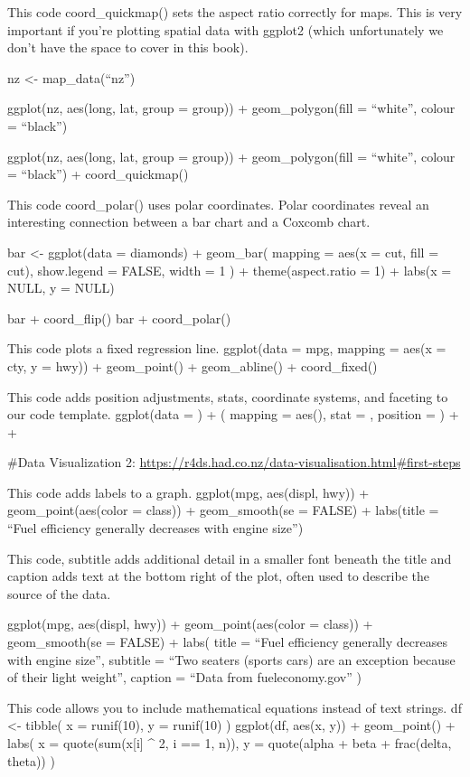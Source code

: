 \documentclass[
]{article}
\begin{document}
This code coord\_quickmap() sets the aspect ratio correctly for maps.
This is very important if you're plotting spatial data with ggplot2
(which unfortunately we don't have the space to cover in this book).

nz \textless- map\_data(``nz'')

ggplot(nz, aes(long, lat, group = group)) + geom\_polygon(fill =
``white'', colour = ``black'')

ggplot(nz, aes(long, lat, group = group)) + geom\_polygon(fill =
``white'', colour = ``black'') + coord\_quickmap()

This code coord\_polar() uses polar coordinates. Polar coordinates
reveal an interesting connection between a bar chart and a Coxcomb
chart.

bar \textless- ggplot(data = diamonds) + geom\_bar( mapping = aes(x =
cut, fill = cut), show.legend = FALSE, width = 1 ) + theme(aspect.ratio
= 1) + labs(x = NULL, y = NULL)

bar + coord\_flip() bar + coord\_polar()

This code plots a fixed regression line. ggplot(data = mpg, mapping =
aes(x = cty, y = hwy)) + geom\_point() + geom\_abline() + coord\_fixed()

This code adds position adjustments, stats, coordinate systems, and
faceting to our code template. ggplot(data = ) + ( mapping = aes(), stat
= , position = ) + +

\#Data Visualization 2:
\url{https://r4ds.had.co.nz/data-visualisation.html\#first-steps}

This code adds labels to a graph. ggplot(mpg, aes(displ, hwy)) +
geom\_point(aes(color = class)) + geom\_smooth(se = FALSE) + labs(title
= ``Fuel efficiency generally decreases with engine size'')

This code, subtitle adds additional detail in a smaller font beneath the
title and caption adds text at the bottom right of the plot, often used
to describe the source of the data.

ggplot(mpg, aes(displ, hwy)) + geom\_point(aes(color = class)) +
geom\_smooth(se = FALSE) + labs( title = ``Fuel efficiency generally
decreases with engine size'', subtitle = ``Two seaters (sports cars) are
an exception because of their light weight'', caption = ``Data from
fueleconomy.gov'' )

This code allows you to include mathematical equations instead of text
strings. df \textless- tibble( x = runif(10), y = runif(10) ) ggplot(df,
aes(x, y)) + geom\_point() + labs( x = quote(sum(x{[}i{]} \^{} 2, i ==
1, n)), y = quote(alpha + beta + frac(delta, theta)) )
\end{document}
